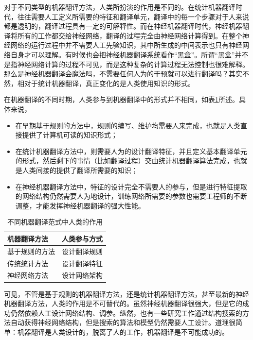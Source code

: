\parinterval 对于不同类型的机器翻译方法，人类所扮演的作用是不同的。在统计机器翻译时代，往往需要人工定义所需要的特征和翻译单元，翻译中的每一个步骤对于人来说都是透明的，翻译过程具有一定的可解释性。而在神经机器翻译时代，神经机器翻译将所有的工作都交给神经网络，翻译的过程完全由神经网络计算得到。在整个神经网络的运行过程中并不需要人工先验知识，其中所生成的中间表示也只有神经网络自身才可以理解。有时候也会把神经机器翻译系统看作“黑盒”。所谓“黑盒”并不是指神经网络计算的过程不可见，而是这种复杂的计算过程无法控制也很难解释。那么是神经机器翻译会魔法吗，不需要任何人为的干预就可以进行翻译吗？其实不然，相对于统计机器翻译，真正变化的是人类使用知识的形式。

\parinterval 在机器翻译的不同时期，人类参与到机器翻译中的形式并不相同，如表\ref{tab:10-5}所述。具体来说，

\begin{itemize}
\item 在早期基于规则的方法中，规则的编写、维护均需要人来完成，也就是人类直接提供了计算机可读的知识形式；
\item 在统计机器翻译方法中，则需要人为的设计翻译特征，并且定义基本翻译单元的形式，然后剩下的事情（比如翻译过程）交由统计机器翻译算法完成，也就是人类间接的提供了翻译所需要的知识；
\item 在神经机器翻译方法中，特征的设计完全不需要人的参与，但是进行特征提取的网络结构仍然需要人为地设计，训练网络所需要的参数也需要工程师的不断调整，才能发挥神经机器翻译的强大性能。
\end{itemize}

\begin{table}[htp]
\centering
\caption{不同机器翻译范式中人类的作用}
\label{tab:10-5}
\begin{tabular}{ l | l }
	机器翻译方法			&人类参与方式 \\ \hline
	\rule{0pt}{13pt} 基于规则的方法					&设计翻译规则 \\
	\rule{0pt}{13pt} 传统统计方法					&设计翻译特征 \\
	\rule{0pt}{13pt} 神经网络方法					&设计网络架构 \\
\end{tabular}
\end{table}

\parinterval 可见，不管是基于规则的机器翻译方法，还是统计机器翻译方法，甚至最新的神经机器翻译方法，人类的作用是不可替代的。虽然神经机器翻译很强大，但是它的成功仍然依赖人工设计网络结构、调参。纵然，也有一些研究工作通过结构搜索的方法自动获得神经网络结构，但是搜索的算法和模型仍然需要人工设计。道理很简单：机器翻译是人类设计的，脱离了人的工作，机器翻译是不可能成功的。

